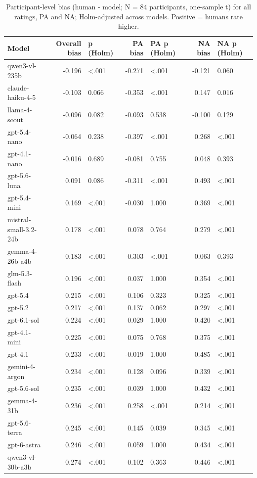 \begin{table}
\caption{Participant-level bias (human - model; N = 84 participants, one-sample t) for all ratings, PA and NA; Holm-adjusted across models. Positive = humans rate higher.}
\begin{tabular}{lrlrlrl}
\toprule
Model & Overall bias & p (Holm) & PA bias & PA p (Holm) & NA bias & NA p (Holm) \\
\midrule
qwen3-vl-235b & -0.196 & <.001 & -0.271 & <.001 & -0.121 & 0.060 \\
claude-haiku-4-5 & -0.103 & 0.066 & -0.353 & <.001 & 0.147 & 0.016 \\
llama-4-scout & -0.096 & 0.082 & -0.093 & 0.538 & -0.100 & 0.129 \\
gpt-5.4-nano & -0.064 & 0.238 & -0.397 & <.001 & 0.268 & <.001 \\
gpt-4.1-nano & -0.016 & 0.689 & -0.081 & 0.755 & 0.048 & 0.393 \\
gpt-5.6-luna & 0.091 & 0.086 & -0.311 & <.001 & 0.493 & <.001 \\
gpt-5.4-mini & 0.169 & <.001 & -0.030 & 1.000 & 0.369 & <.001 \\
mistral-small-3.2-24b & 0.178 & <.001 & 0.078 & 0.764 & 0.279 & <.001 \\
gemma-4-26b-a4b & 0.183 & <.001 & 0.303 & <.001 & 0.063 & 0.393 \\
glm-5.3-flash & 0.196 & <.001 & 0.037 & 1.000 & 0.354 & <.001 \\
gpt-5.4 & 0.215 & <.001 & 0.106 & 0.323 & 0.325 & <.001 \\
gpt-5.2 & 0.217 & <.001 & 0.137 & 0.062 & 0.297 & <.001 \\
gpt-6.1-sol & 0.224 & <.001 & 0.029 & 1.000 & 0.420 & <.001 \\
gpt-4.1-mini & 0.225 & <.001 & 0.075 & 0.768 & 0.375 & <.001 \\
gpt-4.1 & 0.233 & <.001 & -0.019 & 1.000 & 0.485 & <.001 \\
gemini-4-argon & 0.234 & <.001 & 0.128 & 0.096 & 0.339 & <.001 \\
gpt-5.6-sol & 0.235 & <.001 & 0.039 & 1.000 & 0.432 & <.001 \\
gemma-4-31b & 0.236 & <.001 & 0.258 & <.001 & 0.214 & <.001 \\
gpt-5.6-terra & 0.245 & <.001 & 0.145 & 0.039 & 0.345 & <.001 \\
gpt-6-astra & 0.246 & <.001 & 0.059 & 1.000 & 0.434 & <.001 \\
qwen3-vl-30b-a3b & 0.274 & <.001 & 0.102 & 0.363 & 0.446 & <.001 \\

\end{tabular}
\end{table}
